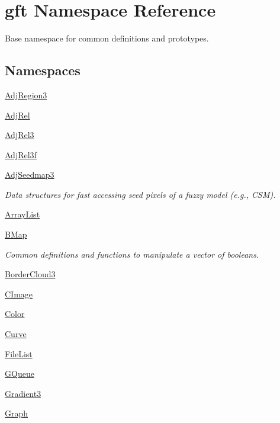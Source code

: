 \hypertarget{namespacegft}{\section{gft Namespace Reference}
\label{namespacegft}
}


Base namespace for common definitions and prototypes.  


\subsection*{Namespaces}
\begin{DoxyCompactItemize}
\item 
\hyperlink{namespacegft_1_1AdjRegion3}{Adj\-Region3}
\item 
\hyperlink{namespacegft_1_1AdjRel}{Adj\-Rel}
\item 
\hyperlink{namespacegft_1_1AdjRel3}{Adj\-Rel3}
\item 
\hyperlink{namespacegft_1_1AdjRel3f}{Adj\-Rel3f}
\item 
\hyperlink{namespacegft_1_1AdjSeedmap3}{Adj\-Seedmap3}
\begin{DoxyCompactList}\small\item\em Data structures for fast accessing seed pixels of a fuzzy model (e.\-g., C\-S\-M). \end{DoxyCompactList}\item 
\hyperlink{namespacegft_1_1ArrayList}{Array\-List}
\item 
\hyperlink{namespacegft_1_1BMap}{B\-Map}
\begin{DoxyCompactList}\small\item\em Common definitions and functions to manipulate a vector of booleans. \end{DoxyCompactList}\item 
\hyperlink{namespacegft_1_1BorderCloud3}{Border\-Cloud3}
\item 
\hyperlink{namespacegft_1_1CImage}{C\-Image}
\item 
\hyperlink{namespacegft_1_1Color}{Color}
\item 
\hyperlink{namespacegft_1_1Curve}{Curve}
\item 
\hyperlink{namespacegft_1_1FileList}{File\-List}
\item 
\hyperlink{namespacegft_1_1GQueue}{G\-Queue}
\item 
\hyperlink{namespacegft_1_1Gradient3}{Gradient3}
\item 
\hyperlink{namespacegft_1_1Graph}{Graph}
\item 

\end{DoxyCompactItemize}
